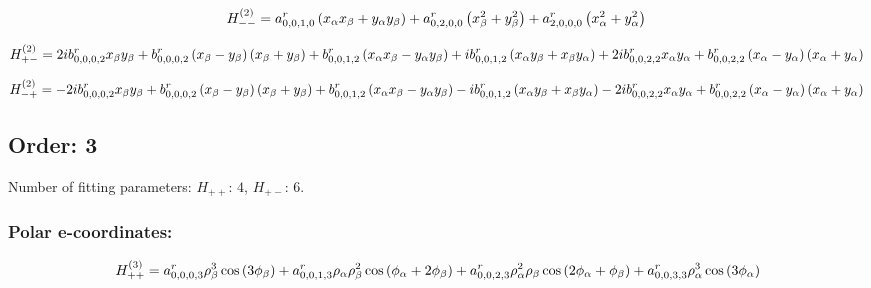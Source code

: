 \documentclass[fleqn]{article}
\begin{document}
\begin{dmath*}
H_{--}^{(2)}=a^{r}_{0,0,1,0} \left(x_{\alpha} x_{\beta} + y_{\alpha} y_{\beta}\right) + a^{r}_{0,2,0,0} \left(x_{\beta}^{2} + y_{\beta}^{2}\right) + a^{r}_{2,0,0,0} \left(x_{\alpha}^{2} + y_{\alpha}^{2}\right)\\
\end{dmath*}

\begin{dmath*}
H_{+-}^{(2)}=2 i b^{r}_{0,0,0,2} x_{\beta} y_{\beta} + b^{r}_{0,0,0,2} \left(x_{\beta} - y_{\beta}\right) \left(x_{\beta} + y_{\beta}\right) + b^{r}_{0,0,1,2} \left(x_{\alpha} x_{\beta} - y_{\alpha} y_{\beta}\right) +  i b^{r}_{0,0,1,2} \left(x_{\alpha} y_{\beta} + x_{\beta} y_{\alpha}\right) + 2 i b^{r}_{0,0,2,2} x_{\alpha} y_{\alpha} + b^{r}_{0,0,2,2} \left(x_{\alpha} - y_{\alpha}\right) \left(x_{\alpha} + y_{\alpha}\right)\\
\end{dmath*}

\begin{dmath*}
H_{-+}^{(2)}=- 2 i b^{r}_{0,0,0,2} x_{\beta} y_{\beta} + b^{r}_{0,0,0,2} \left(x_{\beta} - y_{\beta}\right) \left(x_{\beta} + y_{\beta}\right) + b^{r}_{0,0,1,2} \left(x_{\alpha} x_{\beta} - y_{\alpha} y_{\beta}\right) -  i b^{r}_{0,0,1,2} \left(x_{\alpha} y_{\beta} + x_{\beta} y_{\alpha}\right) - 2 i b^{r}_{0,0,2,2} x_{\alpha} y_{\alpha} + b^{r}_{0,0,2,2} \left(x_{\alpha} - y_{\alpha}\right) \left(x_{\alpha} + y_{\alpha}\right)\\
\end{dmath*}
\subsection{Order: 3}
Number of fitting parameters: $H_{++}$: $4$, $H_{+-}$: $6$.
\subsubsection*{Polar e-coordinates:}

\begin{dmath*}
H_{++}^{(3)}=a^{r}_{0,0,0,3} \rho_{\beta}^{3} \cos{\left (3 \phi_{\beta} \right )} + a^{r}_{0,0,1,3} \rho_{\alpha} \rho_{\beta}^{2} \cos{\left (\phi_{\alpha} + 2 \phi_{\beta} \right )} + a^{r}_{0,0,2,3} \rho_{\alpha}^{2} \rho_{\beta} \cos{\left (2 \phi_{\alpha} + \phi_{\beta} \right )} + a^{r}_{0,0,3,3} \rho_{\alpha}^{3} \cos{\left (3 \phi_{\alpha} \right )}\\
\end{dmath*}
\end{document}
